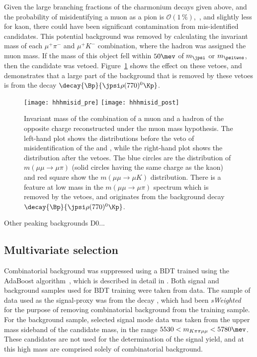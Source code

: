 Given the large branching fractions of the charmonium decays given above, and the probability of
misidentifying a muon as a pion is $\mathcal{O}(1\,\%)$,~\cite{LHCb-DP-2013-001}, and slightly less
for kaon, there could have been significant contamination from mis-identified candidates.
This potential background was removed by calculating the invariant mass of each $\mu^+\pi^-$ and
$\mu^+K^-$ combination, where the hadron was assigned the muon mass.
If the mass of this object fell within $50\mev$ of $m_\jpsi$ or $m_\psitwos$, then the candidate
was vetoed.
Figure~\ref{fig:hhh:misid} shows the effect on these vetoes, and demonstrates that a large part
of the background that is removed by these vetoes is from the decay
$\decay{\Bp}{\jpsi\rho(770)^0\Kp}$.


\begin{figure}
  \begin{center}
    \texttt{[image: hhhmisid\_pre]}
    \texttt{[image: hhhmisid\_post]}
    \caption{\small
      Invariant mass of the combination of a muon and a hadron of the opposite charge
      reconstructed under the muon mass hypothesis.
      The left-hand plot shows the distributions before the veto of misidentification of the \jpsi
      and \psitwos, while the right-hand plot shows the distribution after the vetoes.
      The blue circles are the distribution of $m(\mu\mu\to\mu\pi)$ (solid circles having the same
      charge as the kaon) and red square show the $m(\mu\mu\to\mu K)$ distribution.
      There is a feature at low mass in the $m(\mu\mu\to\mu\pi)$ spectrum which is removed by the
      vetoes, and originates from the background decay $\decay{\Bp}{\jpsi\rho(770)^0\Kp}$.
    }
    \label{fig:hhh:misid}
  \end{center}
\end{figure}

Other peaking backgrounds D0...






\subsection{Multivariate selection}
\label{sec:hhh:bdt}
Combinatorial background was suppressed using a BDT trained using the AdaBoost
algorithm~\cite{AdaBoost}, which is described in detail in .
Both signal and background samples used for BDT training were taken from data.
The sample of data used as the signal-proxy was from  the decay \btojpsikpipi, which had been
\emph{sWeighted}~\cite{splot} for the purpose of removing combinatorial background from the
training sample.
For the background sample, selected signal mode data was taken from the upper mass sideband of the
\Bp candidate mass, in the range $5530<m_{K\pi\pi\mu\mu}<5780\mev$.
These candidates are not used for the determination of the signal yield, and at this high mass are
comprised solely of combinatorial background.

